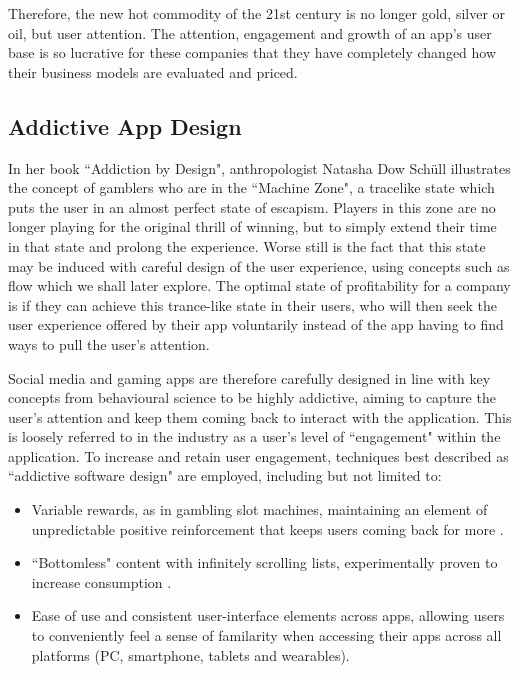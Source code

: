 Therefore, the new hot commodity of the 21st century is no longer gold, silver or oil, but user attention. The attention, engagement and growth of an app's user base is so lucrative for these companies that they have completely changed how their business models are evaluated and priced.

\subsection{Addictive App Design}
In her book ``Addiction by Design", anthropologist Natasha Dow Schüll \cite{schull2014addiction} illustrates the concept of gamblers who are in the ``Machine Zone", a tracelike state which puts the user in an almost perfect state of escapism. Players in this zone are no longer playing for the original thrill of winning, but to simply extend their time in that state and prolong the experience. Worse still is the fact that this state may be induced with careful design of the user experience, using concepts such as flow\cite{csikszentmihalyi1990flow} which we shall later explore. The optimal state of profitability for a company is if they can achieve this trance-like state in their users, who will then seek the user experience offered by their app voluntarily instead of the app having to find ways to pull the user's attention.

Social media and gaming apps are therefore carefully designed in line with key concepts from behavioural science to be highly addictive, aiming to capture the user's attention and keep them coming back to interact with the application. This is loosely referred to in the industry as a user's level of ``engagement" within the application. To increase and retain user engagement, techniques best described as ``addictive software design" \cite{neyman2017survey} are employed, including but not limited to:

\begin{itemize}
    \item Variable rewards, as in gambling slot machines, maintaining an element of unpredictable positive reinforcement that keeps users coming back for more \cite{neyman2017survey}.
    \item ``Bottomless" content with infinitely scrolling lists, experimentally proven to increase consumption \cite{neyman2017survey}.
    \item Ease of use and consistent user-interface elements across apps, allowing users to conveniently feel a sense of familarity when accessing their apps across all platforms (PC, smartphone, tablets and wearables).
\end{itemize}

